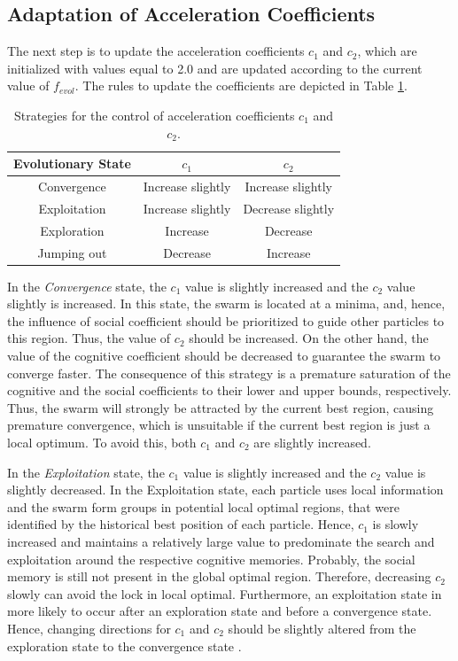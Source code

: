 \subsection{Adaptation of Acceleration Coefficients}
The next step is to update the acceleration coefficients $c_1$ and $c_2$, which are initialized with values equal to 2.0 and are updated according to the current value of $f_{evol}$. The rules to update the coefficients are depicted in Table \ref{tab:apso_strategies}.

\begin{table}[!ht]
\caption{Strategies for the control of acceleration coefficients $c_1$ and $c_2$.}
\centering
\begin{tabular}{c c c}
\hline
Evolutionary State  &   $c_{1}$               &  $c_{2}$ \\
\hline
Convergence    & Increase slightly     & Increase slightly \\
Exploitation   & Increase slightly     & Decrease slightly \\
Exploration    & Increase              & Decrease \\
Jumping out    & Decrease              & Increase  \\
\hline
\end{tabular}
\label{tab:apso_strategies}
\end{table}

In the \emph{Convergence} state, the $c_1$ value is slightly increased and the $c_2$ value slightly is increased. In this state, the swarm is located at a minima, and, hence, the influence of social coefficient should be prioritized to guide other particles to this region. Thus, the value of $c_2$ should be increased. On the other hand, the value of the cognitive coefficient should be decreased to guarantee the swarm to converge faster. The consequence of this strategy is a premature saturation of the cognitive and the social coefficients to their lower and upper bounds, respectively. Thus, the swarm will strongly be attracted by the current best region, causing premature convergence, which is unsuitable if the current best region is just a local optimum. To avoid this, both $c_1$ and $c_2$ are slightly increased.

In the \emph{Exploitation} state, the $c_1$ value is slightly increased and the $c_2$ value is slightly decreased. In the Exploitation state, each particle uses local information and the swarm form groups in potential local optimal regions, that were identified by the historical best position of each particle. Hence, $c_1$ is slowly increased and maintains a relatively large value to predominate the search and exploitation around the respective cognitive memories. Probably, the social memory is still not present in the global optimal region. Therefore, decreasing $c_2$ slowly can avoid the lock in local optimal. Furthermore, an exploitation state in more likely to occur after an exploration state and before a convergence state. Hence, changing directions for $c_1$ and $c_2$ should be slightly altered from the exploration state to the convergence state \cite{APSO:Zhan2009}.

